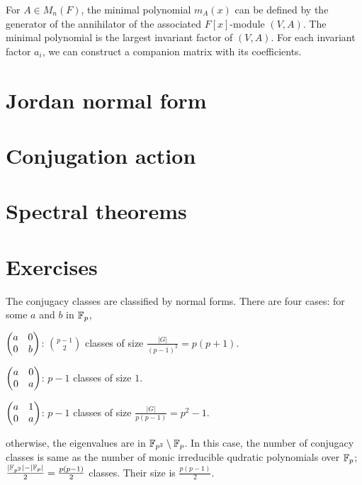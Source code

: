 \documentclass{../../large}
\begin{document}
For $A\in M_n(F)$, the minimal polynomial $m_A(x)$ can be defined by the generator of the annihilator of the associated $F[x]$-module $(V,A)$.
The minimal polynomial is the largest invariant factor of $(V,A)$.
For each invariant factor $a_i$, we can construct a companion matrix with its coefficients.



\section{Jordan normal form}


\section{Conjugation action}

\begin{prb}
\end{prb}

\section{Spectral theorems}

\section*{Exercises}

\begin{prb}
The conjugacy classes are classified by normal forms.
There are four cases: for some $a$ and $b$ in $\mathbb{F}_p$,
\begin{parts}
\item $\begin{pmatrix}a&0\\0&b\end{pmatrix}$: $\binom{p-1}2$ classes of size $\frac{|G|}{(p-1)^2}=p(p+1)$.
\item $\begin{pmatrix}a&0\\0&a\end{pmatrix}$: $p-1$ classes of size $1$.
\item $\begin{pmatrix}a&1\\0&a\end{pmatrix}$: $p-1$ classes of size $\frac{|G|}{p(p-1)}=p^2-1$.
\item otherwise, the eigenvalues are in $\mathbb{F}_{p^2}\setminus\mathbb{F}_p$.
In this case, the number of conjugacy classes is same as the number of monic irreducible qudratic polynomials over $\mathbb{F}_p$; $\frac{|\mathbb{F}_{p^2}|-|\mathbb{F}_p|}2=\frac{p(p-1)}2$ classes.
Their size is $\frac{p(p-1)}2$.
\end{parts}
\end{prb}
\end{document}

